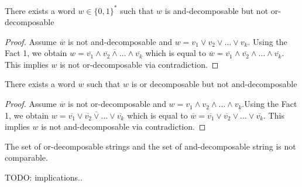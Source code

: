\begin{theorem}
	There exists a word $w \in \{0,1\}^*$ such that $w$ is and-decomposable but not or-decomposable
\end{theorem}

\begin{proof}
	Assume $\overbar{w}$ is not and-decomposable and $w = v_1 \lor v_2 \lor \dots \lor v_k$. Using the Fact 1, we obtain $w = \overbar{\overbar{v_1} \land \overbar{v_2} \land \dots \land \overbar{v_k}}$ which is equal to $\overbar{w} = \overbar{v_1} \land \overbar{v_2} \land \dots \land \overbar{v_k}$. This implies $w$ is not or-decomposable via contradiction.
\end{proof}


\begin{theorem}
	There exists a word $w$ such that $w$ is or decomposable but not and-decomposable
\end{theorem}

\begin{proof}
	Assume $\overbar{w}$ is not or-decomposable and $w = v_1 \land v_2 \land \dots \land v_k$.Using the Fact 1, we obtain $w = \overbar{\overbar{v_1} \lor \overbar{v_2} \lor \dots \lor \overbar{v_k}}$ which is equal to $\overbar{w} = \overbar{v_1} \lor \overbar{v_2} \lor \dots \lor \overbar{v_k}$. This implies $w$ is not and-decomposable via contradiction.
\end{proof}

\begin{corollary}
	The set of or-decomposable strings and the set of and-decomposable string is not comparable.
\end{corollary}


TODO: implications..


